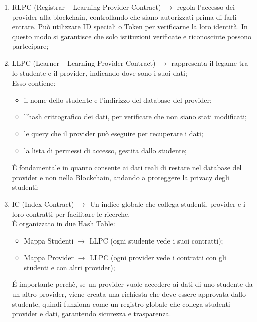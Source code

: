 \begin{enumerate}
    \item RLPC (Registrar – Learning Provider Contract) $\rightarrow$ regola l’accesso dei provider alla blockchain, controllando che siano autorizzati prima di farli entrare. Può utilizzare ID speciali o Token per verificarne la loro identità. In questo modo si garantisce che solo istituzioni verificate e riconosciute possono partecipare;
    \item LLPC (Learner – Learning Provider Contract) $\rightarrow$ rappresenta il legame tra lo studente e il provider, indicando dove sono i suoi dati;
          \\Esso contiene:
            \begin{itemize}
                \item il nome dello studente e l'indirizzo del database del provider;
                \item l’hash crittografico dei dati, per verificare che non siano stati modificati;
                \item le query che il provider può eseguire per recuperare i dati;
                \item la lista di permessi di accesso, gestita dallo studente;
            \end{itemize}
            \'E fondamentale in quanto consente ai dati reali di restare nel database del provider e non nella Blockchain, andando a proteggere la privacy degli studenti;
    \item IC (Index Contract) $\rightarrow$ Un indice globale che collega studenti, provider e i loro contratti per facilitare le ricerche.
            \\\'E organizzato in due Hash Table:
            \begin{itemize}
                \item Mappa Studenti $\rightarrow$ LLPC (ogni studente vede i suoi contratti);
                \item Mappa Provider $\rightarrow$ LLPC (ogni provider vede i contratti con gli studenti e con altri provider);
            \end{itemize}
            \'E importante perchè, se un provider vuole accedere ai dati di uno studente da un altro provider, viene creata una richiesta che deve essere approvata dallo studente, quindi funziona come un registro globale che collega studenti provider e dati, garantendo sicurezza e trasparenza.
\end{enumerate}
